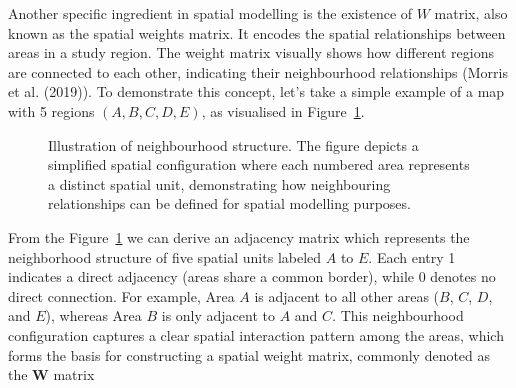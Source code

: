 \documentclass[
  default,
]{sn-jnl}
\begin{document}
Another specific ingredient in spatial modelling is the existence of
\(W\) matrix, also known as the spatial weights matrix. It encodes the
spatial relationships between areas in a study region. The weight matrix
visually shows how different regions are connected to each other,
indicating their neighbourhood relationships (Morris et al. (2019)). To
demonstrate this concept, let's take a simple example of a map with 5
regions \((A, B, C, D, E)\), as visualised in
Figure~\ref{fig-neighsimple}.

\label{cell-fig-neighsimple}
\begin{figure}[H]


\caption{\label{fig-neighsimple}Illustration of neighbourhood structure.
The figure depicts a simplified spatial configuration where each
numbered area represents a distinct spatial unit, demonstrating how
neighbouring relationships can be defined for spatial modelling
purposes.}

\end{figure}%

From the Figure~\ref{fig-neighsimple} we can derive an adjacency matrix
which represents the neighborhood structure of five spatial units
labeled \(A\) to \(E\). Each entry 1 indicates a direct adjacency (areas
share a common border), while 0 denotes no direct connection. For
example, Area \(A\) is adjacent to all other areas (\(B\), \(C\), \(D\),
and \(E\)), whereas Area \(B\) is only adjacent to \(A\) and \(C\). This
neighbourhood configuration captures a clear spatial interaction pattern
among the areas, which forms the basis for constructing a spatial weight
matrix, commonly denoted as the \(\mathbf{W}\) matrix
\end{document}
